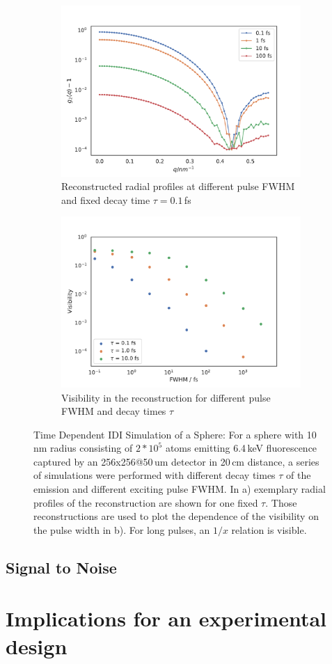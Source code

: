 \begin{figure}
	\begin{subfigure}[b]{0.45\textwidth}
		\includegraphics[width=\linewidth]{images/tdsphere.pdf}
		\caption{Reconstructed radial profiles at different pulse FWHM and fixed decay time $\tau = 0.1$\,fs}
	\end{subfigure}
	\begin{subfigure}[b]{0.45\textwidth}
		\includegraphics[width=\linewidth]{images/tdpspherevis.pdf}
		\caption{Visibility in the reconstruction for different pulse FWHM and decay times $\tau$}
	\end{subfigure}
	\caption[Time Dependent IDI Simulation of a Sphere]{Time Dependent IDI Simulation of a Sphere: For a sphere with 10\,nm radius consisting of $2*10^5$ atoms emitting 6.4\,keV fluorescence captured by an 256x256@50\,um detector in 20\,cm distance, a series of simulations were performed with different decay times $\tau$ of the emission and different exciting pulse FWHM. In a) exemplary radial profiles of the reconstruction are shown for one fixed $\tau$. Those reconstructions are used to plot the  dependence of the visibility on the pulse width in b). For long pulses, an $1/x$ relation is visible.}
	\label{fig:tdpshere}
\end{figure}

\subsection{Signal to Noise}

\section{Implications for an experimental design}
